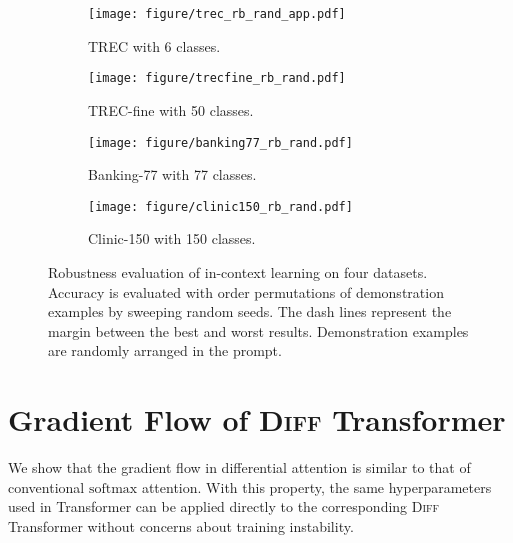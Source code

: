 \documentclass{article}
\newcommand{\softmax}{\mathrm{softmax}}
\newcommand\ourattn{differential attention}
\newcommand\diff{\textsc{Diff} Transformer}
\begin{document}
\begin{figure}[h]
\centering
\begin{subfigure}[b]{0.49\textwidth}
\texttt{[image: figure/trec\_rb\_rand\_app.pdf]}
\caption{TREC with 6 classes.}
\label{fig:icl-trec-rb-rand}
\end{subfigure}
\hfill
\begin{subfigure}[b]{0.49\textwidth}
\texttt{[image: figure/trecfine\_rb\_rand.pdf]}
\caption{TREC-fine with 50 classes.}
\label{fig:icl-trecfine-rb-rand}
\end{subfigure}

\vfill
\vskip 0.15in

\begin{subfigure}[b]{0.49\textwidth}
\texttt{[image: figure/banking77\_rb\_rand.pdf]}
\caption{Banking-77 with 77 classes.}
\label{fig:icl-bank77-rb-rand}
\end{subfigure}
\hfill
\begin{subfigure}[b]{0.49\textwidth}
\texttt{[image: figure/clinic150\_rb\_rand.pdf]}
\caption{Clinic-150 with 150 classes.}
\label{fig:icl-clinic-rand}
\end{subfigure}
\caption{Robustness evaluation of in-context learning on four datasets.
Accuracy is evaluated with order permutations of demonstration examples by sweeping random seeds.
The dash lines represent the margin between the best and worst results.
Demonstration examples are randomly arranged in the prompt.}
\label{fig:icl-rb-rand}
\end{figure}


\newpage
\section{Gradient Flow of \diff{}}
\label{app:grad}

We show that the gradient flow in \ourattn{} is similar to that of conventional $\softmax$ attention. With this property, the same hyperparameters used in Transformer can be applied directly to the corresponding \diff{} without concerns about training instability.
\end{document}
